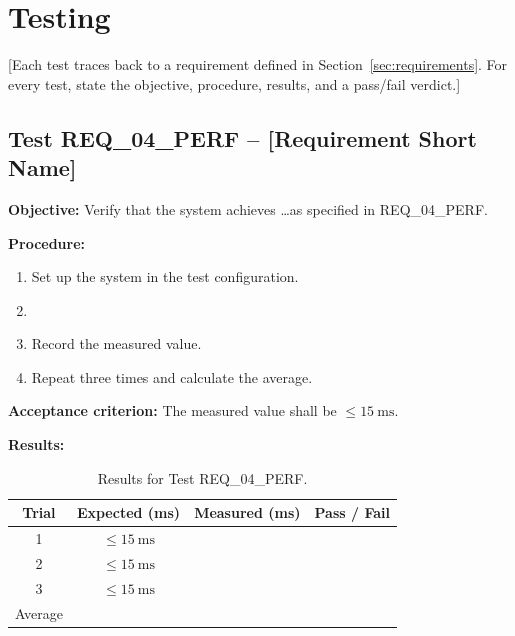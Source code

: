 \chapter{Testing}
\label{ch:testing}

[Each test traces back to a requirement defined in
Section~\ref{sec:requirements}. For every test, state the
objective, procedure, results, and a pass/fail verdict.]

%

\section{Test REQ\_04\_PERF – [Requirement Short Name]}
\label{sec:test-req04}

\textbf{Objective:} Verify that the system achieves \ldots as
specified in REQ\_04\_PERF.

\textbf{Procedure:}
\begin{enumerate}
    \item Set up the system in the test configuration.
    \item [Step 2 \ldots]
    \item Record the measured value.
    \item Repeat three times and calculate the average.
\end{enumerate}

\textbf{Acceptance criterion:} The measured value shall be
$\leq \SI{15}{\milli\second}$.

\textbf{Results:}

\begin{table}[H]
    \centering
    \caption{Results for Test REQ\_04\_PERF.}
    \label{tab:test-req04}
    \begin{tabular}{@{} c c c c @{}}
        \toprule
        \textbf{Trial} & \textbf{Expected (\si{\ms})}
            & \textbf{Measured (\si{\ms})} & \textbf{Pass / Fail} \\
        \midrule
        1 & $\leq \SI{15}{\milli\second}$ & & \\
        2 & $\leq \SI{15}{\milli\second}$ & & \\
        3 & $\leq \SI{15}{\milli\second}$ & & \\
        \midrule
        Average & & & \\
        \bottomrule
    \end{tabular}
\end{table}

